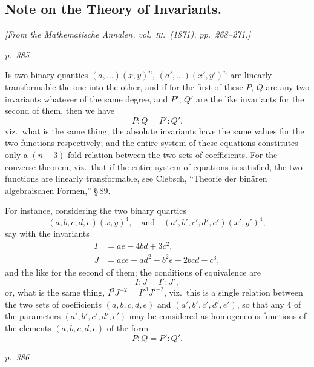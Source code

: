 \documentclass[11pt,a4paper]{article}
\theoremstyle{plain}
\theoremstyle{definition}
\begin{document}
\subsection{Note on the Theory of Invariants.}

\begin{center}
\textit{[From the Mathematische Annalen, vol.~\textsc{iii}.\ (1871), pp.~268--271.]}
\end{center}

\textit{p.~385}

\noindent
\textsc{If} two binary quantics $(a, \ldots)(x, y)^n$, $(a', \ldots)(x', y')^n$ are linearly transformable
the one into the other, and if for the first of these $P$, $Q$ are any two invariants whatever
of the same degree, and $P'$, $Q'$ are the like invariants for the second of them, then
we have
\[
P : Q = P' : Q'.
\]
viz.\ what is the same thing, the absolute invariants have the same values for the two
functions respectively; and the entire system of these equations constitutes only a
$(n-3)$-fold relation between the two sets of coefficients.  For the converse theorem,
viz.\ that if the entire system of equations is satisfied, the two functions are linearly
transformable, see Clebsch, ``Theorie der bin\"aren algebraischen Formen,'' \S\,89.

For instance, considering the two binary quartics
\[
(a, b, c, d, e)(x, y)^4, \quad \text{and} \quad (a', b', c', d', e')(x', y')^4,
\]
say with the invariants
\[
\begin{aligned}
I &= ae - 4bd + 3c^2, \\
J &= ace - ad^2 - b^2 e + 2bcd - c^3,
\end{aligned}
\]
and the like for the second of them; the conditions of equivalence are
\[
I : J = I' : J',
\]
or, what is the same thing, $I^3 J^{-2} = I'^3 J'^{-2}$, viz.\ this is a single relation between
the two sets of coefficients $(a, b, c, d, e)$ and $(a', b', c', d', e')$, so that any 4 of the
parameters $(a', b', c', d', e')$ may be considered as homogeneous functions of the
elements $(a, b, c, d, e)$ of the form
\[
P : Q = P' : Q'.
\]

\clearpage

\bigskip
\textit{p.~386}
\smallskip
\end{document}
